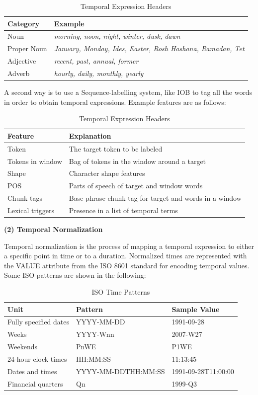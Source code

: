 \documentclass[a4paper,12pt]{report}
\begin{document}
\begin{table}[h]
\centering
\begin{tabular}{l l}
\hline 
 \textbf{Category} & \textbf{Example}  \\
 \hline 
 Noun & \textit{morning, noon, night, winter, dusk, dawn} \\  
Proper Noun & \textit{January, Monday, Ides, Easter, Rosh Hashana, Ramadan, Tet}\\
Adjective & \textit{recent, past, annual, former}	 \\
 Adverb & \textit{hourly, daily, monthly, yearly}
\end{tabular}
\caption{\label{tab:table-name}Temporal Expression Headers}
\end{table}

\noindent
A second way is to use a Sequence-labelling system, like IOB to tag all the words in order to obtain temporal expressions. Example features are as follows: 

\begin{table}[h]
\centering
\begin{tabular}{l l}
\hline 
 \textbf{Feature} & \textbf{Explanation}  \\
 \hline 
 Token & The target token to be labeled \\  
Tokens in window & Bag of tokens in the window around a target\\
Shape & Character shape features	 \\
 POS & Parts of speech of target and window words\\
 Chunk tags & Base-phrase chunk tag for target and words in a window\\
 Lexical triggers & Presence in a list of temporal terms
\end{tabular}
\caption{\label{tab:table-name}Temporal Expression Headers}
\end{table}

\pagebreak
\noindent
\textbf{(2) Temporal Normalization}

\noindent
Temporal normalization is the process of mapping a temporal expression to either a specific point in time or to a duration. Normalized times are represented with the VALUE attribute from the ISO 8601 standard for encoding temporal values. Some ISO patterns are shown in the following: 

\begin{table}[h]
\centering
\begin{tabular}{l l l}
\hline 
 \textbf{Unit} & \textbf{Pattern} & \textbf{Sample Value}  \\
 \hline 
 Fully specified dates & YYYY-MM-DD & 1991-09-28 \\  
Weeks & YYYY-$\text{Wnn}$ & 2007-W27\\
Weekends & PnWE & P1WE	 \\
 24-hour clock times & HH:MM:SS & 11:13:45\\
 Dates and times & YYYY-MM-DDTHH:MM:SS & 1991-09-28T11:00:00\\
 Financial quarters & Qn & 1999-Q3
\end{tabular}
\caption{\label{tab:table-name}ISO Time Patterns}
\end{table}
\end{document}
